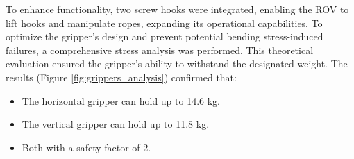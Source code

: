 To enhance functionality, two screw hooks were integrated, enabling the ROV to lift hooks and manipulate ropes, expanding its operational capabilities. To optimize the gripper’s design and prevent potential bending stress-induced failures, a comprehensive stress analysis was performed. This theoretical evaluation ensured the gripper’s ability to withstand the designated weight. The results (Figure \ref{fig:grippers_analysis}) confirmed that:

\vspace{-0.5\baselineskip}
\begin{itemize}
    \setlength{\itemsep}{0pt}
    \item The horizontal gripper can hold up to 14.6 kg.
    \item The vertical gripper can hold up to 11.8 kg.
    \item Both with a safety factor of 2.
\end{itemize}

